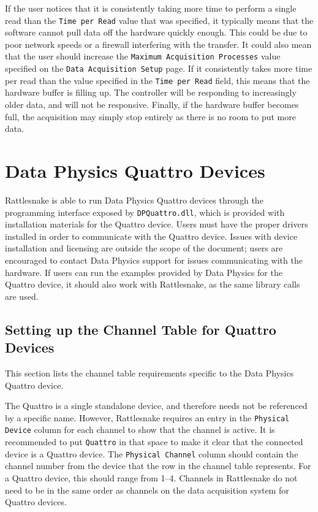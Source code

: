 \documentclass[pdf,12pt,report]{SANDreport}
\newcommand{\inlineCode}{\lstinline[basicstyle=\bfseries\ttfamily]}
\begin{document}
    If the user notices that it is consistently taking more time to perform a single read than the \inlineCode{Time per Read} value that was specified, it typically means that the software cannot pull data off the hardware quickly enough.  This could be due to poor network speeds or a firewall interfering with the transfer.  It could also mean that the user should increase the \inlineCode{Maximum Acquisition Processes} value specified on the \inlineCode{Data Acquisition Setup} page.  If it consistently takes more time per read than the value specified in the \inlineCode{Time per Read} field, this means that the hardware buffer is filling up.  The controller will be responding to increasingly older data, and will not be responsive.  Finally, if the hardware buffer becomes full, the acquisition may simply stop entirely as there is no room to put more data.

    \chapter{Data Physics Quattro Devices}\label{sec:rattlesnake_hardware_dp_quattro}
    
    Rattlesnake is able to run Data Physics Quattro devices through the programming interface exposed by \inlineCode{DPQuattro.dll}, which is provided with installation materials for the Quattro device.  Users must have the proper drivers installed in order to communicate with the Quattro device.  Issues with device installation and licensing are outside the scope of the document; users are encouraged to contact Data Physics support for issues communicating with the hardware.  If users can run the examples provided by Data Physics for the Quattro device, it should also work with Rattlesnake, as the same library calls are used.
    
    \section{Setting up the Channel Table for Quattro Devices}
    
    This section lists the channel table requirements specific to the Data Physics Quattro device.
    
    The Quattro is a single standalone device, and therefore needs not be referenced by a specific name.  However, Rattlesnake requires an entry in the \inlineCode{Physical Device} column for each channel to show that the channel is active.  It is recommended to put \inlineCode{Quattro} in that space to make it clear that the connected device is a Quattro device.  The \inlineCode{Physical Channel} column should contain the channel number from the device that the row in the channel table represents.  For a Quattro device, this should range from 1--4.  Channels in Rattlesnake do not need to be in the same order as channels on the data acquisition system for Quattro devices.
    
\end{document}
